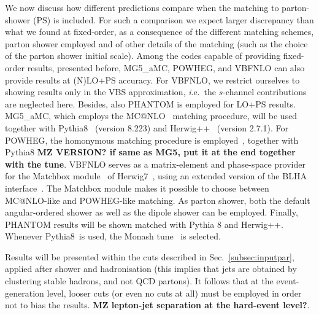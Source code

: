 We now discuss how different predictions compare when the matching to parton-shower (PS) is included. For such
a comparison we expect larger discrepancy than what we found at fixed-order, as a consequence of the different
matching schemes, parton shower employed and of other details of the matching (such as the choice of the parton shower initial scale). Among
the codes capable of providing fixed-order results, presented before, {\sc MG5\_aMC}, {\sc POWHEG}, and {\sc VBFNLO}
can also provide results at (N)LO+PS accuracy. For {\sc VBFNLO}, we
restrict ourselves to showing results only in the VBS approximation,
{\emph i.e.}\ the $s$-channel contributions are neglected here. Besides,
also {\sc PHANTOM} is employed for LO+PS results.\\
{\sc MG5\_aMC}, which
employs the {\sc MC@NLO}~\cite{Frixione:2002ik} matching procedure, will be used together with {\sc Pythia8}~\cite{Sjostrand:2014zea} (version 8.223)
and {\sc Herwig++}~\cite{Bahr:2008pv, Bellm:2013hwb} (version 2.7.1). For {\sc POWHEG}, the homonymous 
matching procedure is employed~\cite{Nason:2004rx,Frixione:2007vw}, together with {\sc Pythia8}
{\bf MZ VERSION? if same as MG5, put it at the end together with the
tune}. {\sc VBFNLO} serves as a matrix-element and phase-space provider
for the {\sc Matchbox} module~\cite{Platzer:2011bc} of {\sc
Herwig7}~\cite{Bellm:2015jjp,Bellm:2017bvx}, using an extended version of the BLHA
interface~\cite{Binoth:2010xt,Alioli:2013nda,Andersen:2014efa}. The {\sc Matchbox} module makes it
possible to choose between {\sc MC@NLO}-like and {\sc POWHEG}-like
matching. As parton shower, both the default angular-ordered shower as
well as the dipole shower can be employed.
Finally, {\sc PHANTOM} results will be shown matched with {\sc Pythia 8} and {\sc Herwig++}.
Whenever {\sc Pythia8}\ is used, the Monash tune~\cite{Skands:2014pea} is selected.

Results will be presented within the cuts described in Sec.~\ref{subsec:inputpar}, applied after shower and hadronisation (this implies that jets
are obtained by clustering stable hadrons, and not QCD partons). It follows that at the event-generation level, looser cuts (or even no cuts at all)
must be employed in order not to bias the results. {\bf MZ lepton-jet separation at the hard-event level?}.

